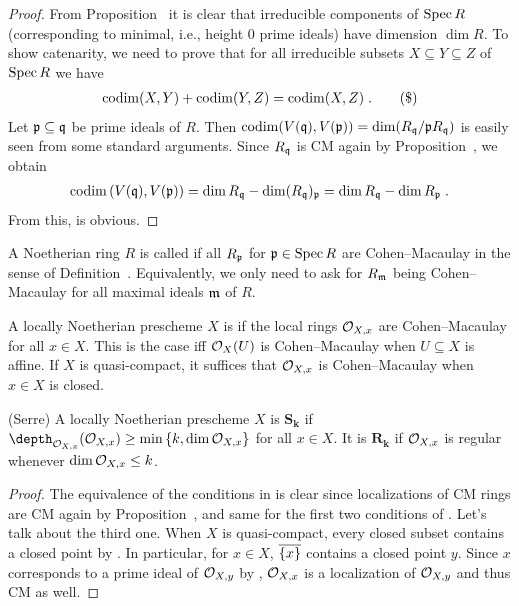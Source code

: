 \documentclass[a4paper,parskip=half,numbers=enddot, DIV=12]{scrreprt}
\begin{document}
\begin{proof}
	From Proposition~ it is clear that irreducible components of $\operatorname{Spec} R$ (corresponding to minimal, i.e., height $0$ prime ideals) have dimension $\dim R$. To show catenarity, we need to prove that for all irreducible subsets $X\subseteq Y\subseteq Z$ of $\operatorname{Spec} R$ we have
	\begin{align}\lbl{eq:catenarity}
		\codim(X,Y)+\codim(Y,Z)=\codim(X,Z)\;.\tag{\$}
	\end{align}
	Let $\mathfrak{p}\subseteq \mathfrak{q}$ be prime ideals of $R$. Then $\operatorname{codim}(V(\mathfrak{q}),V(\mathfrak{p}))=\dim(R_{\mathfrak{q}}/\mathfrak{p} R_{\mathfrak{q}})$ is easily seen from some standard arguments. Since $R_{\mathfrak{q}}$ is CM again by Proposition~, we obtain
	\begin{align*}
		\operatorname{codim}\left(V(\mathfrak{q}),V(\mathfrak{p})\right)=\dim R_{\mathfrak{q}}-\dim (R_{\mathfrak{q}})_{\mathfrak{p}}=\dim R_{\mathfrak{q}}-\dim R_{\mathfrak{p}}\;.
	\end{align*}
	From this,  is obvious.
\end{proof}
\begin{defi}
	\begin{alphanumerate}
		\item A Noetherian ring $R$ is called  if all $R_{\mathfrak{p}}$ for $\mathfrak{p}\in\operatorname{Spec} R$ are Cohen--Macaulay in the sense of Definition~. Equivalently, we only need to ask for $R_{\mathfrak{m}}$ being Cohen--Macaulay for all maximal ideals $\mathfrak{m}$ of $R$.
		\item A locally Noetherian prescheme $X$ is  if the local rings $\mathcal{O}_{X,x}$ are Cohen--Macaulay for all $x\in X$. This is the case iff $\mathcal{O}_X(U)$ is Cohen--Macaulay when $U\subseteq X$ is affine. If $X$ is quasi-compact, it suffices that $\mathcal{O}_{X,x}$ is Cohen--Macaulay when $x\in X$ is closed.
		\item (Serre) A locally Noetherian prescheme $X$ is $\boldsymbol{S_k}$ if $\depth_{\Oo_{X,x}}(\Oo_{X,x})\geq \min\left\{k,\dim\Oo_{X,x}\right\}$ for all $x\in X$. It is $\boldsymbol{R_k}$ if $\mathcal{O}_{X,x}$ is regular whenever $\dim\mathcal{O}_{X,x}\leq k$.
	\end{alphanumerate}
\end{defi}
\begin{proof}
	The equivalence of the conditions in  is clear since localizations of CM rings are CM again by Proposition~, and same for the first two conditions of . Let's talk about the third one. When $X$ is quasi-compact, every closed subset contains a closed point by \cite[Proposition~2.1.1]{alggeo1}. In particular, for $x\in X$, $\overline{\{x\}}$ contains a closed point $y$. Since $x$ corresponds to a prime ideal of $\mathcal{O}_{X,y}$ by \cite[Proposition~2.1.3]{alggeo1}, $\mathcal{O}_{X,x}$ is a localization of $\mathcal{O}_{X,y}$ and thus CM as well.
\end{proof}
\end{document}
